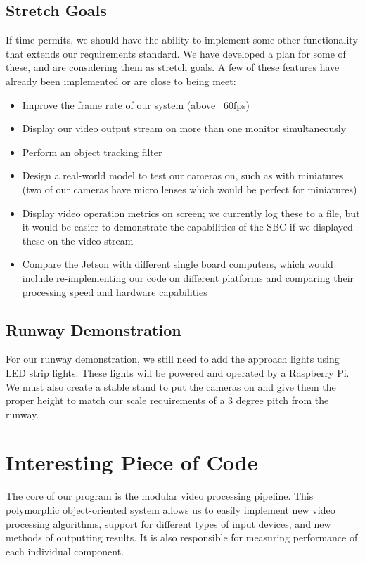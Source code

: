 \documentclass[letterpaper,10pt,titlepage]{IEEEtran}
\begin{document}
	\subsection{Stretch Goals}
	If time permits, we should have the ability to implement some other functionality that extends our requirements standard. We have developed a plan for some of these, and are considering them as stretch goals. A few of these features have already been implemented or are close to being meet:\\
	\begin{itemize}
		\item Improve the frame rate of our system (above ~60fps)
		\item Display our video output stream on more than one monitor simultaneously  
		\item Perform an object tracking filter
		\item Design a real-world model to test our cameras on, such as with miniatures (two of our cameras have micro lenses which would be perfect for miniatures)
		\item Display video operation metrics on screen; we currently log these to a file, but it would be easier to demonstrate the capabilities of the SBC if we displayed these on the video stream
		\item Compare the Jetson with different single board computers, which would include re-implementing our code on different platforms and comparing their processing speed and hardware capabilities\\
	\end{itemize}
	
  \subsection{Runway Demonstration}
  For our runway demonstration, we still need to add the approach lights using LED strip lights. These lights will be powered and operated by a Raspberry Pi. We must also create a stable stand to put the cameras on and give them the proper height to match our scale requirements of a 3 degree pitch from the runway. 
	
   \section{Interesting Piece of Code}
   The core of our program is the modular video processing pipeline. This polymorphic object-oriented system allows us to easily implement new video processing algorithms, support for different types of input devices, and new methods of outputting results. It is also responsible for measuring performance of each individual component.\\
   
\end{document}

